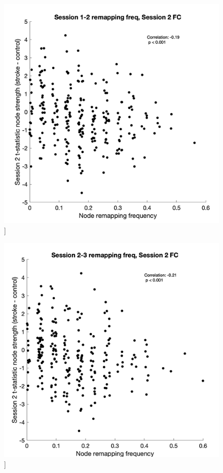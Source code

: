 \documentclass[phd,tocprelim]{cornell}
\renewcommand{\caption}[1]{\singlespacing\hangcaption{#1}\normalspacing}
\begin{document}
\begin{figure}[h!]
		\ContinuedFloat
		\captionsetup{labelformat=adja-page}
    \centering
    \includegraphics[width=\textwidth]{chapter1/SupplementaryFigure9B.png}
    \caption[]{}
\end{figure}
\null
\vfill
\clearpage
\null
\vfill
\begin{figure}[h!]
		\ContinuedFloat
		\captionsetup{labelformat=adja-page}
    \centering
    \includegraphics[width=\textwidth]{chapter1/SupplementaryFigure9C.png}
    \caption[]{}
\end{figure}
\end{document}
